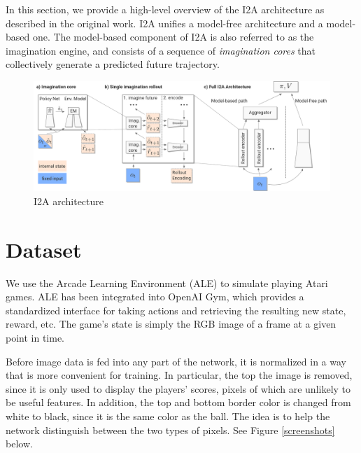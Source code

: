 \documentclass[10pt, twocolumn]{article}
\begin{document}
In this section, we provide a high-level overview of the I2A architecture as described in the original work. I2A unifies a model-free architecture and a model-based one. The model-based component of I2A is also referred to as the imagination engine, and consists of a sequence of \emph{imagination cores} that collectively generate a predicted future trajectory.

\begin{figure}
\centering
\includegraphics[scale=0.3]{i2a}
\caption{I2A architecture}
\end{figure}

\section{Dataset}
We use the Arcade Learning Environment (ALE) to simulate playing Atari games. ALE has been integrated
into OpenAI Gym, which provides a standardized interface for taking actions and retrieving the resulting new
state, reward, etc. The game's state is simply the RGB image of a frame at a given point in time.

Before image data is fed into any part of the network, it is normalized in a way that is more convenient for training.
In particular, the top the image is removed, since it is only used to display the players' scores, pixels of which are
unlikely to be useful features. In addition, the top and bottom border color is changed from white to black, since
it is the same color as the ball. The idea is to help the network distinguish between the two types of pixels.
See Figure \ref{screenshots} below.
\end{document}
